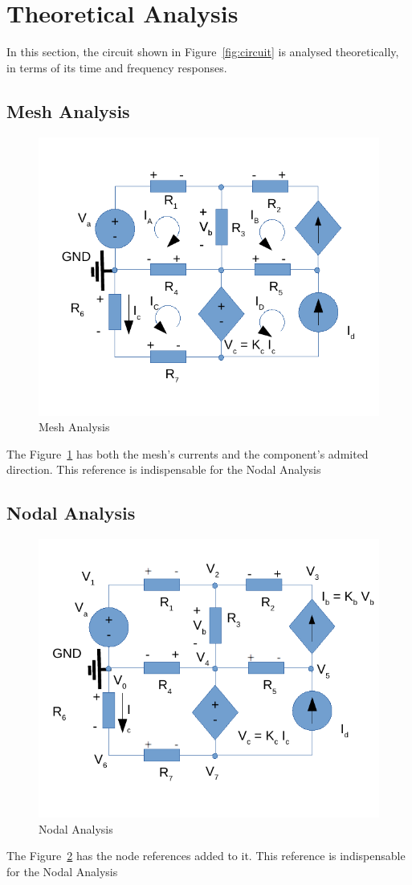 \section{Theoretical Analysis}
\label{sec:analysis}

In this section, the circuit shown in Figure~\ref{fig:circuit} is analysed
theoretically, in terms of its time and frequency responses.

\subsection{Mesh Analysis}

\begin{figure}
\includegraphics[width=0.4\linewidth]{circ_mesh.pdf}
\caption{Mesh Analysis}
\label{fig:circuitMesh}
\end{figure}

The Figure~\ref{fig:circuitMesh} has both the mesh's currents and the 
component's admited direction.
This reference is indispensable for the Nodal Analysis

\subsection{Nodal Analysis}

\begin{figure}
\includegraphics[width=0.4\linewidth]{circ_node.pdf}
\caption{Nodal Analysis}
\label{fig:circuitNodes}
\end{figure}

The Figure~\ref{fig:circuitNodes} has the node references added to it.
This reference is indispensable for the Nodal Analysis



